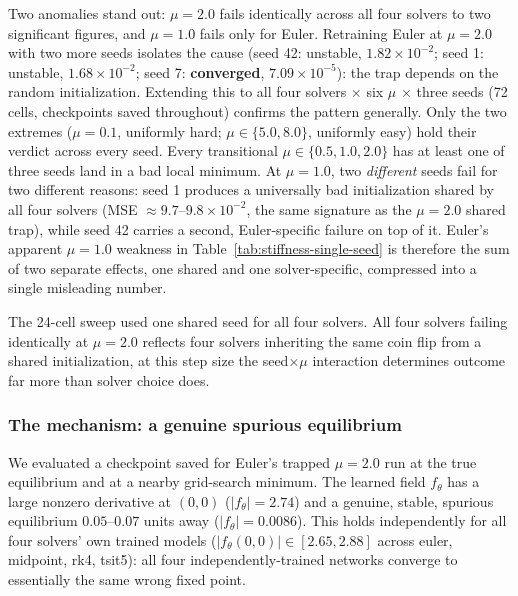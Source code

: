 Two anomalies stand out: $\mu=2.0$ fails identically across all four solvers
to two significant figures, and $\mu=1.0$ fails only for Euler. Retraining
Euler at $\mu=2.0$ with two more seeds isolates the cause (seed 42: unstable,
$1.82\times10^{-2}$; seed 1: unstable, $1.68\times10^{-2}$; seed 7:
\textbf{converged}, $7.09\times10^{-5}$): the trap depends on the random
initialization. Extending this to all four solvers $\times$ six $\mu$
$\times$ three seeds (72 cells, checkpoints saved throughout) confirms the
pattern generally. Only the two extremes ($\mu=0.1$, uniformly hard;
$\mu\in\{5.0,8.0\}$, uniformly easy) hold their verdict across every seed.
Every transitional $\mu\in\{0.5,1.0,2.0\}$ has at least one of three seeds
land in a bad local minimum. At $\mu=1.0$, two \emph{different} seeds fail
for two different reasons: seed 1 produces a universally bad initialization
shared by all four solvers (MSE $\approx9.7\text{--}9.8\times10^{-2}$, the
same signature as the $\mu=2.0$ shared trap), while seed 42 carries a second,
Euler-specific failure on top of it. Euler's apparent $\mu=1.0$ weakness in
Table~\ref{tab:stiffness-single-seed} is therefore the sum of two separate
effects, one shared and one solver-specific, compressed into a single
misleading number.

\begin{keypoint}
The 24-cell sweep used one shared seed for all four solvers. All four solvers
failing identically at $\mu=2.0$ reflects four solvers inheriting the same
coin flip from a shared initialization, at this step size the seed$\times\mu$
interaction determines outcome far more than solver choice does.
\end{keypoint}

\subsubsection{The mechanism: a genuine spurious equilibrium}

We evaluated a checkpoint saved for Euler's trapped $\mu=2.0$ run at the true
equilibrium and at a nearby grid-search minimum. The learned field
$f_\theta$ has a large nonzero derivative at $(0,0)$ ($|f_\theta|=2.74$) and a
genuine, stable, spurious equilibrium $0.05$--$0.07$ units away
($|f_\theta|=0.0086$). This holds independently for all four solvers' own
trained models ($|f_\theta(0,0)|\in[2.65,2.88]$ across euler, midpoint, rk4,
tsit5): all four independently-trained networks converge to essentially the
same wrong fixed point.

